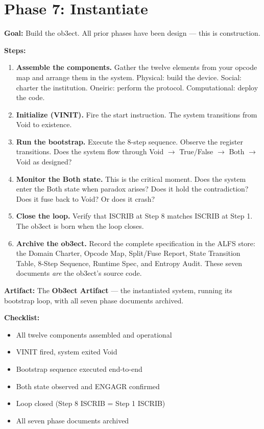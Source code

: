 \documentclass[12pt,a4paper]{article}
\begin{document}
\section{Phase 7: Instantiate}

{\bf Goal:} Build the ob3ect. All prior phases have been design — this is
construction.

{\bf Steps:}

\begin{enumerate}[label=\textbf{7.\arabic*.}, leftmargin=2em]
\item \textbf{Assemble the components.} Gather the twelve elements from your
    opcode map and arrange them in the system. Physical: build the device.
    Social: charter the institution. Oneiric: perform the protocol.
    Computational: deploy the code.

\item \textbf{Initialize (VINIT).} Fire the start instruction. The system
    transitions from Void to existence.

\item \textbf{Run the bootstrap.} Execute the 8-step sequence. Observe the
    register transitions. Does the system flow through Void $\to$ True/False
    $\to$ Both $\to$ Void as designed?

\item \textbf{Monitor the Both state.} This is the critical moment. Does the
    system enter the Both state when paradox arises? Does it hold the
    contradiction? Does it fuse back to Void? Or does it crash?

\item \textbf{Close the loop.} Verify that ISCRIB at Step 8 matches ISCRIB at
    Step 1. The ob3ect is born when the loop closes.

\item \textbf{Archive the ob3ect.} Record the complete specification in the
    ALFS store: the Domain Charter, Opcode Map, Split/Fuse Report, State
    Transition Table, 8-Step Sequence, Runtime Spec, and Entropy Audit.
    These seven documents {\it are} the ob3ect's source code.
\end{enumerate}

{\bf Artifact:} The \textbf{Ob3ect Artifact} — the instantiated system,
running its bootstrap loop, with all seven phase documents archived.

{\bf Checklist:}
\begin{itemize}
\item[ ] All twelve components assembled and operational
\item[ ] VINIT fired, system exited Void
\item[ ] Bootstrap sequence executed end-to-end
\item[ ] Both state observed and ENGAGR confirmed
\item[ ] Loop closed (Step 8 ISCRIB = Step 1 ISCRIB)
\item[ ] All seven phase documents archived
\end{itemize}
\end{document}
